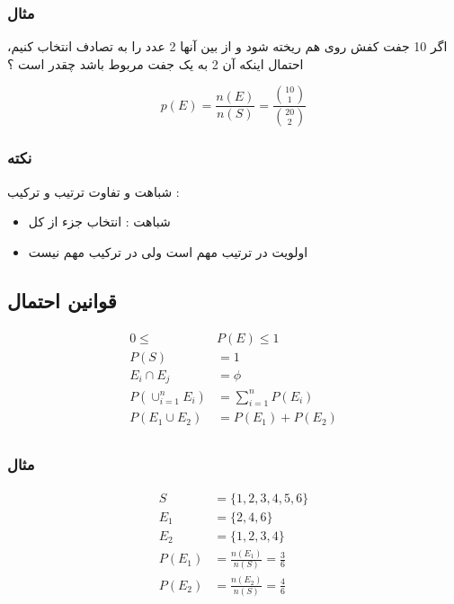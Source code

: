\documentclass[12pt]{book}
\begin{document}


\subsubsection{مثال}
اگر 10 جفت کفش روی هم ریخته شود و از بین آنها 2 عدد را به تصادف انتخاب کنیم، احتمال اینکه آن 2 به یک جفت مربوط باشد چقدر است ؟

$$
p(E) = \frac{n(E)}{n(S)} = \frac{\binom{10}{1}}{\binom{20}{2}}
$$


\subsubsection{نکته}
شباهت و تفاوت ترتیب و ترکیب :

\begin{itemize}
	\item شباهت : انتخاب جزء از کل
	\item اولویت در ترتیب مهم است ولی در ترکیب مهم نیست
\end{itemize}





\subsection{قوانین احتمال}

\begin{align*}
0 \leq &P(E) \leq 1 \\
P(S) &= 1 \\
E_{i} \cap E_{j} &= \phi \\
P(\cup^{n}_{i=1} E_{i}) &= \sum^{n}_{i=1} P(E_{i}) \\
P(E_{1} \cup E_{2} ) &= P(E_{1}) + P(E_{2}) \\
\end{align*}



\subsubsection{مثال}


\begin{align*}
S &= \{ 1, 2, 3, 4, 5, 6 \} \\
E_{1} &= \{ 2, 4, 6 \} \\
E_{2} &= \{ 1, 2, 3, 4 \} \\
P(E_{1}) &= \frac{n(E_{1})}{n(S)} = \frac{3}{6} \\
P(E_{2}) &= \frac{n(E_{2})}{n(S)} = \frac{4}{6} \\
\end{align*}
\end{document}
